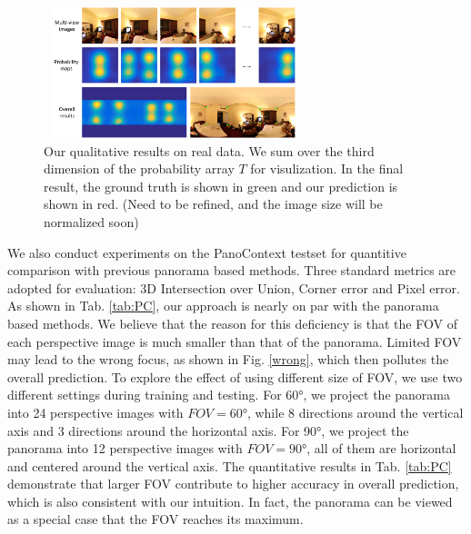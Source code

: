 \begin{figure}
	\includegraphics[height=1.5in, width=3in]{figs/results1.png}
	\caption{Our qualitative results on real data. We sum over the third dimension of the probability array $T$ for visulization. In the final result, the ground truth is shown in green and our prediction is shown in red. (Need to be refined, and the image size will be normalized soon)}
	\label{fig:results1}
\end{figure}

We also conduct experiments on the PanoContext testset for quantitive comparison with previous panorama based methods. Three standard metrics are adopted for evaluation: 3D Intersection over Union, Corner error and Pixel error. As shown in Tab. \ref{tab:PC}, our approach is nearly on par with the panorama based methods. We believe that the reason for this deficiency is that the FOV of each perspective image is much smaller than that of the panorama. Limited FOV may lead to the wrong focus, as shown in Fig. \ref{wrong}, which then pollutes the overall prediction. To explore the effect of using different size of FOV, we use two different settings during training and testing. For \ang{60}, we project the panorama into 24 perspective images with $FOV=\ang{60}$, while 8 directions around the vertical axis and 3 directions around the horizontal axis. For \ang{90}, we project the panorama into 12 perspective images with $FOV=\ang{90}$, all of them are horizontal and centered around the vertical axis. The quantitative results in Tab. \ref{tab:PC} demonstrate that larger FOV contribute to higher accuracy in overall prediction, which is also consistent with our intuition. In fact, the panorama can be viewed as a special case that the FOV reaches its maximum.






